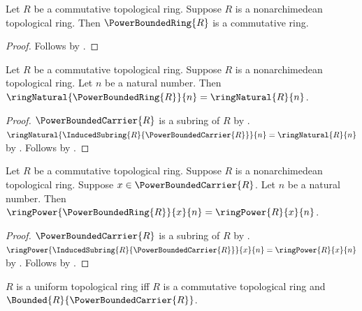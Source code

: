 \begin{classification}\label{power_bounded_ring_is_commutative_ring}
    Let $R$ be a commutative topological ring.
    Suppose $R$ is a nonarchimedean topological ring.
    Then $\PowerBoundedRing{R}$ is a commutative ring.
\end{classification}
\begin{proof}
    Follows by .
\end{proof}

\begin{theorem}\label{power_bounded_ring_natural_agreement}
    Let $R$ be a commutative topological ring.
    Suppose $R$ is a nonarchimedean topological ring.
    Let $n$ be a natural number.
    Then $\ringNatural{\PowerBoundedRing{R}}{n}=\ringNatural{R}{n}$.
\end{theorem}
\begin{proof}
    $\PowerBoundedCarrier{R}$ is a subring of $R$ by
        .
    $\ringNatural{\InducedSubring{R}{\PowerBoundedCarrier{R}}}{n}
        =\ringNatural{R}{n}$ by
        .
    Follows by .
\end{proof}

\begin{theorem}\label{power_bounded_ring_power_agreement}
    Let $R$ be a commutative topological ring.
    Suppose $R$ is a nonarchimedean topological ring.
    Suppose $x\in\PowerBoundedCarrier{R}$.
    Let $n$ be a natural number.
    Then $\ringPower{\PowerBoundedRing{R}}{x}{n}
        =\ringPower{R}{x}{n}$.
\end{theorem}
\begin{proof}
    $\PowerBoundedCarrier{R}$ is a subring of $R$ by
        .
    $\ringPower{\InducedSubring{R}{\PowerBoundedCarrier{R}}}{x}{n}
        =\ringPower{R}{x}{n}$ by
        .
    Follows by .
\end{proof}

\begin{definition}\label{uniform_topological_ring}
    $R$ is a uniform topological ring iff
        $R$ is a commutative topological ring and
        $\Bounded{R}{\PowerBoundedCarrier{R}}$.
\end{definition}
